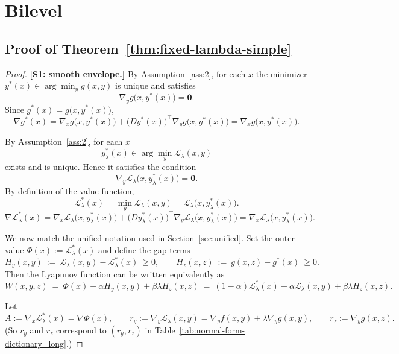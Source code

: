 \documentclass{article}
\newcommand{\1}{\mathbf{1}}
\begin{document}
\section{Bilevel}



\subsection{Proof of Theorem~\ref{thm:fixed-lambda-simple}}\label{subsec:proof-bilevel}
\begin{proof}

\textbf{[S1: smooth envelope.]}
\noindent By Assumption~\ref{ass:2}, for each $x$ the minimizer $y^{*}(x)\in\arg\min_{y}g(x,y)$ is unique and satisfies
\[
\nabla_y g\bigl(x,y^{*}(x)\bigr)=\mathbf{0}.
\]
Since $g^{*}(x)=g\bigl(x,y^{*}(x)\bigr)$, 
\[
\nabla g^{*}(x)
=\nabla_x g\bigl(x,y^{*}(x)\bigr)
+\bigl(Dy^{*}(x)\bigr)^{\top}\nabla_y g\bigl(x,y^{*}(x)\bigr)
=\nabla_x g\bigl(x,y^{*}(x)\bigr).
\]

\medskip
\noindent By Assumption~\ref{ass:2}, for each $x$ 
\[
y_\lambda^{*}(x)\in\arg\min_{y}\mathcal L_\lambda(x,y)
\]
exists and is unique. Hence it satisfies the condition
\[
\nabla_y \mathcal L_\lambda\bigl(x,y_\lambda^{*}(x)\bigr)=\mathbf{0}.
\]
By definition of the value function,
\[
\mathcal L_\lambda^{*}(x)=\min_{y}\mathcal L_\lambda(x,y)=\mathcal L_\lambda\bigl(x,y_\lambda^{*}(x)\bigr).
\]
\[
\nabla \mathcal L_\lambda^{*}(x)
=\nabla_x \mathcal L_\lambda\bigl(x,y_\lambda^{*}(x)\bigr)
+\bigl(Dy_\lambda^{*}(x)\bigr)^{\top}\nabla_y \mathcal L_\lambda\bigl(x,y_\lambda^{*}(x)\bigr)
=\nabla_x \mathcal L_\lambda\bigl(x,y_\lambda^{*}(x)\bigr).
\]

\medskip
\noindent We now match the unified notation used in Section~\ref{sec:unified}.
Set the outer value $\Phi(x):=\mathcal L_\lambda^{*}(x)$ and define the gap terms
\[
H_y(x,y)\ :=\ \mathcal L_\lambda(x,y)-\mathcal L_\lambda^{*}(x)\ \ge 0,
\qquad
H_z(x,z)\ :=\ g(x,z)-g^{*}(x)\ \ge 0.
\]
Then the Lyapunov function can be written equivalently as
\[
W(x,y,z)\ =\ \Phi(x)+\alpha H_y(x,y)+\beta\lambda H_z(x,z)
          \ =\ (1-\alpha)\mathcal L_\lambda^{*}(x)+\alpha \mathcal L_\lambda(x,y)+\beta\lambda H_z(x,z).
\]

\medskip
\noindent Let
\[
A:=\nabla_x\mathcal L_\lambda^{*}(x)=\nabla \Phi(x),\qquad
r_y:=\nabla_y \mathcal L_\lambda(x,y)=\nabla_y f(x,y)+\lambda\nabla_y g(x,y),\qquad
r_z:=\nabla_y g(x,z).
\]
(So $r_y$ and $r_z$ correspond to $(r_y,r_z)$ in Table~\ref{tab:normal-form-dictionary_long}.)


\end{proof}
\end{document}
